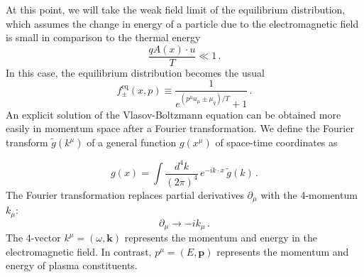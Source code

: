 At this point, we will take the weak field limit of the equilibrium distribution, which assumes the change in energy of a particle due to the electromagnetic field is small in comparison to the thermal energy
\begin{equation}
    \frac{ qA(x)\cdot u}{T}\ll 1\,.
\end{equation}
In this case, the equilibrium distribution becomes the usual
\begin{equation}\label{eq:equilibriumFD}
f^\mathrm{eq}_\pm(x,p) \equiv \frac{1}{e^{(p^{\mu}  u_\mu\pm \mu_q)/T} + 1}\,.
\end{equation}
An explicit solution of the Vlasov-Boltzmann  equation can be obtained more easily in momentum space after a Fourier transformation.  We define the Fourier transform $\widetilde{g}(k^\mu)$ of a general function $g(x^\mu)$ of space-time coordinates as 

\begin{equation}\label{eq:ftdef}
g(x) = \int \frac{d^4k}{(2\pi)^4} \, e^{-i k \cdot x} \, \widetilde{g}(k)\,.
\end{equation} 
The Fourier transformation replaces partial derivatives $\partial_\mu$ with the 4-momentum $k_\mu$:
\begin{equation}
\partial_\mu \rightarrow - i k_\mu \,.
\end{equation}
The 4-vector $k^\mu = (\omega,\mathbf{k})$ represents the momentum and energy in the electromagnetic field. In contrast, $p^{\mu}  = (E,\boldsymbol{p})$ represents the momentum and energy of plasma constituents.

